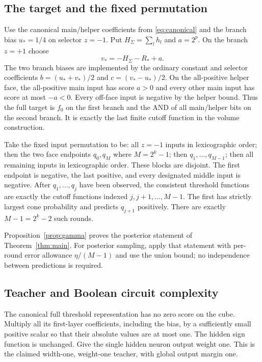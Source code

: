 \documentclass[11pt]{article}
\begin{document}
\subsection{The target and the fixed permutation}

Use the canonical main/helper coefficients from \eqref{eq:canonical}
and the branch bias $u_*=1/4$ on selector $z=-1$. Put
$H_\Sigma=\sum_lh_l$ and $a=2^p$. On the branch $z=+1$ choose
\[
 v_*=-H_\Sigma-R_*+a.
\]
The two branch biases are implemented by the ordinary constant and
selector coefficients $b=(u_*+v_*)/2$ and $c=(v_*-u_*)/2$.
On the all-positive helper face, the all-positive main input has score
$a>0$ and every other main input has score at most $-a<0$.
Every off-face input is negative by the helper bound. Thus the full
target is $f_0$ on the first branch and the AND of all main/helper bits
on the second branch. It is exactly the last finite cutoff function
in the volume construction.

Take the fixed input permutation to be: all $z=-1$ inputs in
lexicographic order; then the two face endpoints $q_0,q_M$ where
$M=2^k-1$; then $q_1,\ldots,q_{M-1}$; then all remaining inputs in
lexicographic order. These blocks are disjoint. The first endpoint is
negative, the last positive, and every designated middle input is
negative. After $q_1,\ldots,q_j$ have been observed, the consistent
threshold functions are exactly the cutoff functions indexed
$j,j+1,\ldots,M-1$. The first has strictly largest cone probability and
predicts $q_{j+1}$ positively. There are exactly $M-1=2^k-2$ such rounds.

Proposition~\ref{prop:gamma} proves the posterior statement of
Theorem~\ref{thm:main}. For posterior sampling, apply that statement with
per-round error allowance $\eta/(M-1)$ and use the union bound; no
independence between predictions is required.

\subsection{Teacher and Boolean circuit complexity}

The canonical full threshold representation has no zero score on the
cube. Multiply all its first-layer coefficients, including the bias,
by a sufficiently small positive scalar so that their absolute values
are at most one. The hidden sign function is unchanged. Give the single
hidden neuron output weight one. This is the claimed width-one,
weight-one teacher, with global output margin one.
\end{document}
